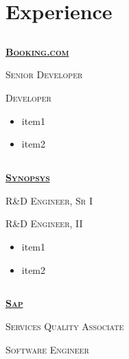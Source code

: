 \documentclass{article}
\begin{document}
\section{Experience}
\subsection[Booking.com]{}
{\raggedright{\textsc{\textbf{\href{https://www.booking.com/}{Booking.com}}}}} \hfill {}

{\raggedright{\textsc{Senior Developer}}} \hfill {}

{\raggedright{\textsc{Developer}}} \hfill {}

\begin{itemize}[noitemsep,nolistsep]
\item item1
\item item2
\end{itemize}

\subsection[Synopsys]{}

{\raggedright{\textsc{\textbf{\href{https://www.synopsys.com/}{Synopsys}}}}} \hfill {}

{\raggedright{\textsc{R\&D Engineer, Sr I}}} \hfill {}

{\raggedright{\textsc{R\&D Engineer, II}}} \hfill {}

\begin{itemize}[noitemsep,nolistsep]
	\item item1
	\item item2
\end{itemize}

\subsection[Sap]{}
{\raggedright{\textsc{\textbf{\href{https://www.sap.com/index.html}{Sap}}}}} \hfill {}

{\raggedright{\textsc{Services Quality Associate}}} \hfill {}

{\raggedright{\textsc{Software Engineer}}} \hfill {}
\end{document}
